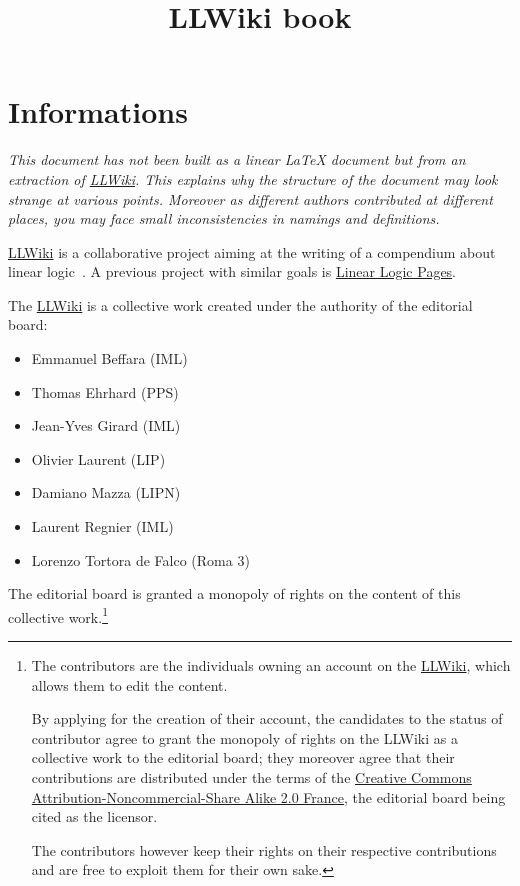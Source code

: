 \documentclass[a4paper,11pt,oneside]{book}
\title{LLWiki book}
\begin{document}
\maketitle

\chapter*{Informations}

\textit{This document has not been built as a linear \LaTeX{} document but from an extraction of \href{http://llwiki.ens-lyon.fr/}{LLWiki}.
This explains why the structure of the document may look strange at various points.
Moreover as different authors contributed at different places, you may face small inconsistencies in namings and definitions.}

\vspace{1.2cm}

\href{http://llwiki.ens-lyon.fr/}{LLWiki} is a collaborative project aiming at the writing of a compendium about linear logic~\cite{linearlogic}.
A previous project with similar goals is \href{https://www.i2m.univ-amu.fr/perso/yves.lafont/pub/llpages.pdf}{Linear Logic Pages}.

The \href{http://llwiki.ens-lyon.fr/}{LLWiki} is a collective work created under the authority of the editorial board:
\begin{itemize}\setlength{\itemsep}{0pt}
\item Emmanuel Beffara (IML)
\item Thomas Ehrhard (PPS)
\item Jean-Yves Girard (IML)
\item Olivier Laurent (LIP)
\item Damiano Mazza (LIPN)
\item Laurent Regnier (IML)
\item Lorenzo Tortora de Falco (Roma 3)
\end{itemize}

The editorial board is granted a monopoly of rights on the content of this collective work.\footnote{The contributors are the individuals owning an account on the \href{http://llwiki.ens-lyon.fr/}{LLWiki}, which allows them to edit the content.

By applying for the creation of their account, the candidates to the status of contributor agree to grant the monopoly of rights on the LLWiki as a collective work to the editorial board; they moreover agree that their contributions are distributed under the terms of the \href{http://creativecommons.org/licenses/by-nc-sa/2.0/fr/deed.en License}{Creative Commons Attribution-Noncommercial-Share Alike 2.0 France}, the editorial board being cited as the licensor.

The contributors however keep their rights on their respective contributions and are free to exploit them for their own sake.}
\end{document}
